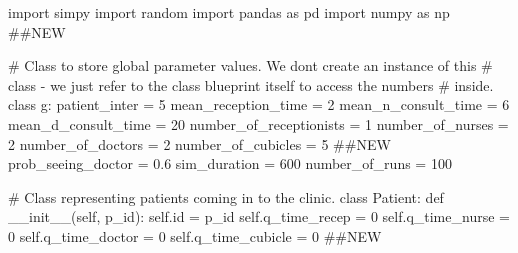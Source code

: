\documentclass[
  letterpaper,
  DIV=11,
  numbers=noendperiod]{scrreprt}
\newenvironment{Shaded}{\begin{snugshade}}{\end{snugshade}}
\newcommand{\BuiltInTok}[1]{\textcolor[rgb]{0.00,0.23,0.31}{#1}}
\newcommand{\CommentTok}[1]{\textcolor[rgb]{0.37,0.37,0.37}{#1}}
\newcommand{\DecValTok}[1]{\textcolor[rgb]{0.68,0.00,0.00}{#1}}
\newcommand{\FloatTok}[1]{\textcolor[rgb]{0.68,0.00,0.00}{#1}}
\newcommand{\FunctionTok}[1]{\textcolor[rgb]{0.28,0.35,0.67}{#1}}
\newcommand{\ImportTok}[1]{\textcolor[rgb]{0.00,0.46,0.62}{#1}}
\newcommand{\KeywordTok}[1]{\textcolor[rgb]{0.00,0.23,0.31}{#1}}
\newcommand{\NormalTok}[1]{\textcolor[rgb]{0.00,0.23,0.31}{#1}}
\newcommand{\OperatorTok}[1]{\textcolor[rgb]{0.37,0.37,0.37}{#1}}
\newcommand{\VariableTok}[1]{\textcolor[rgb]{0.07,0.07,0.07}{#1}}
\begin{document}
\begin{tcolorbox}[enhanced jigsaw, rightrule=.15mm, colback=white, colframe=quarto-callout-note-color-frame, colbacktitle=quarto-callout-note-color!10!white, toprule=.15mm, coltitle=black, opacityback=0, titlerule=0mm, bottomtitle=1mm, breakable, title=\textcolor{quarto-callout-note-color}{\faInfo}\hspace{0.5em}{Click here to view the full code}, opacitybacktitle=0.6, toptitle=1mm, arc=.35mm, bottomrule=.15mm, leftrule=.75mm, left=2mm]

\begin{Shaded}
\begin{Highlighting}[]
\ImportTok{import}\NormalTok{ simpy}
\ImportTok{import}\NormalTok{ random}
\ImportTok{import}\NormalTok{ pandas }\ImportTok{as}\NormalTok{ pd}
\ImportTok{import}\NormalTok{ numpy }\ImportTok{as}\NormalTok{ np }\CommentTok{\#\#NEW}

\CommentTok{\# Class to store global parameter values.  We don\textquotesingle{}t create an instance of this}
\CommentTok{\# class {-} we just refer to the class blueprint itself to access the numbers}
\CommentTok{\# inside.}
\KeywordTok{class}\NormalTok{ g:}
\NormalTok{    patient\_inter }\OperatorTok{=} \DecValTok{5}
\NormalTok{    mean\_reception\_time }\OperatorTok{=} \DecValTok{2}
\NormalTok{    mean\_n\_consult\_time }\OperatorTok{=} \DecValTok{6}
\NormalTok{    mean\_d\_consult\_time }\OperatorTok{=} \DecValTok{20}
\NormalTok{    number\_of\_receptionists }\OperatorTok{=} \DecValTok{1}
\NormalTok{    number\_of\_nurses }\OperatorTok{=} \DecValTok{2}
\NormalTok{    number\_of\_doctors }\OperatorTok{=} \DecValTok{2}
\NormalTok{    number\_of\_cubicles }\OperatorTok{=} \DecValTok{5} \CommentTok{\#\#NEW}
\NormalTok{    prob\_seeing\_doctor }\OperatorTok{=} \FloatTok{0.6}
\NormalTok{    sim\_duration }\OperatorTok{=} \DecValTok{600}
\NormalTok{    number\_of\_runs }\OperatorTok{=} \DecValTok{100}

\CommentTok{\# Class representing patients coming in to the clinic.}
\KeywordTok{class}\NormalTok{ Patient:}
    \KeywordTok{def} \FunctionTok{\_\_init\_\_}\NormalTok{(}\VariableTok{self}\NormalTok{, p\_id):}
        \VariableTok{self}\NormalTok{.}\BuiltInTok{id} \OperatorTok{=}\NormalTok{ p\_id}
        \VariableTok{self}\NormalTok{.q\_time\_recep }\OperatorTok{=} \DecValTok{0}
        \VariableTok{self}\NormalTok{.q\_time\_nurse }\OperatorTok{=} \DecValTok{0}
        \VariableTok{self}\NormalTok{.q\_time\_doctor }\OperatorTok{=} \DecValTok{0}
        \VariableTok{self}\NormalTok{.q\_time\_cubicle }\OperatorTok{=} \DecValTok{0} \CommentTok{\#\#NEW}


\end{Highlighting}
\end{Shaded}
\end{tcolorbox}
\end{document}
